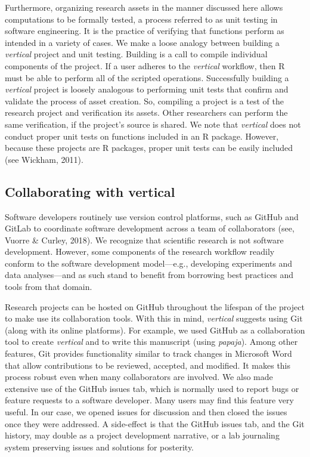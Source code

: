\documentclass[
  english,
  jou,floatsintext]{apa6}
\begin{document}
Furthermore, organizing research assets in the manner discussed here allows computations to be formally tested, a process referred to as unit testing in software engineering. It is the practice of verifying that functions perform as intended in a variety of cases. We make a loose analogy between building a \emph{vertical} project and unit testing. Building is a call to compile individual components of the project. If a user adheres to the \emph{vertical} workflow, then R must be able to perform all of the scripted operations. Successfully building a \emph{vertical} project is loosely analogous to performing unit tests that confirm and validate the process of asset creation. So, compiling a project is a test of the research project and verification its assets. Other researchers can perform the same verification, if the project's source is shared. We note that \emph{vertical} does not conduct proper unit tests on functions included in an R package. However, because these projects are R packages, proper unit tests can be easily included (see Wickham, 2011).

\hypertarget{collaborating-with-vertical}{%
\subsection{Collaborating with vertical}\label{collaborating-with-vertical}}

Software developers routinely use version control platforms, such as GitHub and GitLab to coordinate software development across a team of collaborators (see, Vuorre \& Curley, 2018). We recognize that scientific research is not software development. However, some components of the research workflow readily conform to the software development model---e.g., developing experiments and data analyses---and as such stand to benefit from borrowing best practices and tools from that domain.

Research projects can be hosted on GitHub throughout the lifespan of the project to make use its collaboration tools. With this in mind, \emph{vertical} suggests using Git (along with its online platforms). For example, we used GitHub as a collaboration tool to create \emph{vertical} and to write this manuscript (using \emph{papaja}). Among other features, Git provides functionality similar to track changes in Microsoft Word that allow contributions to be reviewed, accepted, and modified. It makes this process robust even when many collaborators are involved. We also made extensive use of the GitHub issues tab, which is normally used to report bugs or feature requests to a software developer. Many users may find this feature very useful. In our case, we opened issues for discussion and then closed the issues once they were addressed. A side-effect is that the GitHub issues tab, and the Git history, may double as a project development narrative, or a lab journaling system preserving issues and solutions for posterity.
\end{document}
